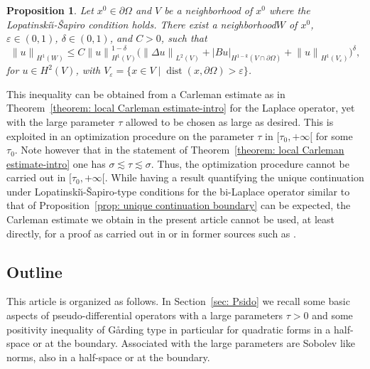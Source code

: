 \documentclass[JEP,XML,SOM,Unicode,published]{cedram}
\let\sep\mid
\theoremstyle{plain}
\newtheorem{proposition}[theorem]{Proposition}
\theoremstyle{definition}
\newcommand{\LS}{Lopatinski\u{\i}-\v{S}apiro\xspace}
\newcommand{\nhd}{neighborhood\xspace}
\let\eps\varepsilon
\newcommand{\Norm}[2]{{\| #1 \|}_{#2}}
\newcommand{\norm}[2]{{|#1|}_{#2}}
\DeclareMathOperator{\dist}{dist}
\begin{document}
\begin{proposition}
\label{prop: unique continuation boundary}
Let $x^0\in\partial \Omega$ and $V$ be a \nhd of $x^0$ where the \LS
condition holds. There exist a \nhd $W$ of $x^0$, $\eps\in
(0,1)$, $\delta \in (0,1)$, and $C>0$, such that
\begin{equation}
\label{eq: local interpolation at the boundary-manifold1}
\Norm{u}{H^1(W)}
\leq C \Norm{u}{H^1(V)}^{1-\delta}
\Big(\Norm{\Delta u}{L^2(V)}
+ \norm{B u}{H^{1-k}(V \cap \partial \Omega)}
+ \Norm{u}{H^1(V_\eps)}
\Big)^\delta,
\end{equation}
for $u \in H^2(V)$, with
$V_\eps = \{ x\in V\sep \dist(x, \partial\Omega) > \eps \}$.
\end{proposition}
This inequality can be obtained from a Carleman estimate as in
Theorem~\ref{theorem: local Carleman estimate-intro} for the Laplace
operator, yet with the large parameter $\tau$ allowed to be chosen as
large as desired. This is exploited in an optimization procedure on
the parameter $\tau$ in $[\tau_0,+\infty[$ for some $\tau_0$. Note
however that in the statement of Theorem~\ref{theorem: local Carleman
estimate-intro} one has $\sigma \lesssim \tau \lesssim
\sigma$. Thus, the
optimization procedure cannot be carried out in $[\tau_0,+\infty[$. While having a
result quantifying the unique continuation under \LS-type conditions
for the bi-Laplace operator
similar to that of Proposition~\ref{prop: unique continuation
boundary} can be
expected, the Carleman estimate we obtain in the present article cannot be used, at
least directly, for a proof as carried out in \cite{JGL-vol1} or in
former sources such as \cite{LR:95}.

\subsection{Outline}
This article is organized as follows.
In Section~\ref{sec: Psido} we recall some basic aspects of
pseudo-differential operators with a large parameters $\tau>0$ and
some positivity inequality of G{\aa}rding type in particular for
quadratic forms in a half-space or at the boundary. Associated with
the large parameters are Sobolev like norms, also in a half-space or
at the boundary.
\end{document}
